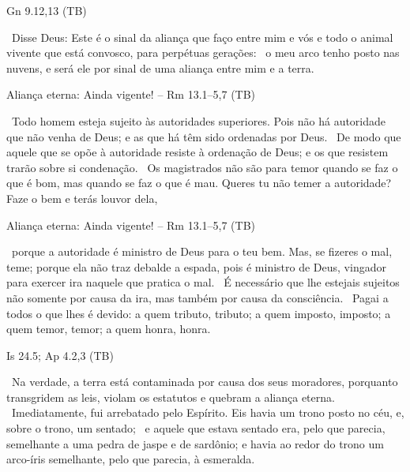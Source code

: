 \documentclass[12pt,aspectratio=169]{beamer}
\newcommand{\ver}[1]{%
    \raisebox{0.50ex}{%
        \scalebox{1.1}{%
            \pmb{\textbf{\textcolor{BSpbg}{#1}}}%
        }%
    }%
}
\newcommand{\QUOTE}[1]{%
    \par\noindent\hspace*{0.05\linewidth}%
    \begin{minipage}{0.9\linewidth}%
        \linespread{1.35}\large{#1}%
    \end{minipage}%
}
\newcommand{\RED}[1]{{\textcolor{TXred}{#1}}}
\newcommand{\YEL}[1]{{\textcolor{TXyel}{#1}}}
\newcommand{\GRE}[1]{{\textcolor{TXgre}{#1}}}
\newcommand{\MAG}[1]{{\textcolor{TXmag}{#1}}}
\newcommand{\BRI}[1]{{\textcolor{BSpbg}{#1}}}   %
\begin{document}
    \begin{frame}{Gn 9.12,13 (TB)}
        \QUOTE{%
            \ver{12}~Disse Deus: Este é o \YEL{sinal da aliança} que faço entre mim e vós e todo
            o animal vivente que está convosco, para \BRI{perpétuas gerações}:
            \ver{13}~\YEL{o meu arco} tenho posto nas nuvens, e será ele por sinal de uma
            \YEL{aliança entre mim e a terra}.
        }
    \end{frame}

    \begin{frame}{Aliança eterna: \BRI{Ainda vigente!} -- Rm 13.1--5,7 (TB)}
        \QUOTE{%
            \ver{1}~Todo homem esteja \YEL{sujeito} às autoridades superiores. Pois \YEL{não há
            autoridade que não venha de Deus}; e as que há têm sido \YEL{ordenadas por Deus}.
            \ver{2}~De modo que aquele que se \RED{opõe} à autoridade \RED{resiste à ordenação
            de Deus}; e os que resistem trarão sobre si \RED{condenação}.
            \ver{3}~Os magistrados não são para temor quando se faz o que é bom, mas quando se
            faz o que é mau. Queres tu não temer a autoridade? \YEL{Faze o bem} e terás louvor
            dela,
        }
    \end{frame}

    \begin{frame}{Aliança eterna: Ainda vigente! -- Rm 13.1--5,7 (TB)}
        \QUOTE{%
            \ver{4}~porque a autoridade é \YEL{ministro de Deus} para o teu bem. Mas, se fizeres
            o mal, teme; porque ela não traz debalde a \MAG{espada}, pois é \MAG{ministro de
            Deus, vingador} para exercer ira naquele que pratica o mal.
            \ver{5}~É necessário que \YEL{lhe estejais sujeitos} não somente por causa da ira,
            mas também por causa da \YEL{consciência}.
            \ver{7}~\YEL{Pagai a todos o que lhes é devido}: a quem tributo, \GRE{tributo}; a
            quem imposto, \GRE{imposto}; a quem temor, \GRE{temor}; a quem honra, \GRE{honra}.
        }
    \end{frame}

    \begin{frame}{Is 24.5; Ap 4.2,3 (TB)}
        \QUOTE{%
            \ver{Is 24.5}~Na verdade, a terra está contaminada por causa dos seus moradores,
            porquanto transgridem as leis, violam os estatutos e \YEL{quebram a aliança eterna}.
            \ver{Ap 4.2}~Imediatamente, fui arrebatado pelo Espírito. Eis havia um \YEL{trono
            posto no céu}, e, sobre o trono, um sentado;
            \ver{Ap 4.3}~e aquele que estava sentado era, pelo que parecia, semelhante a uma
            pedra de jaspe e de sardônio; e \YEL{havia ao redor do trono um arco-íris}
            semelhante, pelo que parecia, à \GRE{esmeralda}.
        }
    \end{frame}
\end{document}
